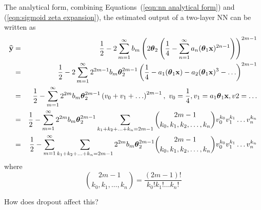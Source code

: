 The analytical form, combining Equations~(\ref{eqn:nn analytical form}) and (\ref{eqn:sigmoid zeta expansion}), the estimated output of a two-layer NN can be written as
\begin{eqnarray}
	\widehat{\bold y} & = & \frac{1}{2} - 2 \sum_{m=1}^\infty b_m \left( 2\boldsymbol\theta_2 \left( \frac{1}{4} - \sum_{n=1}^\infty a_n (\boldsymbol\theta_1 {\bold x})^{2n-1} \right) \right)^{2m - 1} \\
		& = & \frac{1}{2} - 2 \sum_{m=1}^\infty 2^{2m-1} b_m \boldsymbol\theta_2^{2m - 1} \left( \frac{1}{4} - a_1 (\boldsymbol\theta_1 {\bold x}) - a_2 (\boldsymbol\theta_1 {\bold x})^3 - \ldots \right)^{2m - 1} \nonumber \\
		& = & \frac{1}{2} - \sum_{m=1}^\infty 2^{2m} b_m \boldsymbol\theta_2^{2m - 1} \left(v_0 + v_1 + \ldots \right)^{2m - 1},\ v_0 = \frac{1}{4}, v_1 = a_1 \boldsymbol\theta_1 {\bold x}, v2 = \ldots \nonumber \\
		& = & \frac{1}{2} - \sum_{m=1}^\infty 2^{2m} b_m \boldsymbol\theta_2^{2m - 1} \sum_{k_1 + k_2 + \ldots + k_n = 2m - 1} \binom{2m-1}{k_0, k_1, k_2, \ldots, k_n} v_0^{k_0} v_1^{k_1} \ldots v_n^{k_n} \nonumber \\
		& = & \frac{1}{2} - \sum_{m=1}^\infty \sum_{k_1 + k_2 + \ldots + k_n = 2m - 1} 2^{2m} b_m \boldsymbol\theta_2^{2m - 1} \binom{2m-1}{k_0, k_1, k_2, \ldots, k_n} v_0^{k_0} v_1^{k_1} \ldots v_n^{k_n}
\end{eqnarray}
where
\[
	\binom{2m-1}{k_0, k_1, \ldots, k_n} = \frac{(2m-1)!}{k_0! k_1! \ldots k_n!}
\]

{\color{red} How does dropout affect this?}
